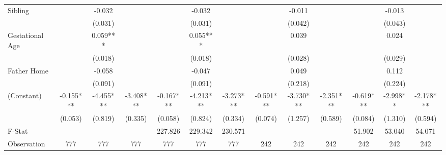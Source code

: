 \begin{tabular}{lcccccccccccc}
Sibling &  & -0.032 &  &  & -0.032 &  &  & -0.011 &  &  & -0.013 &  \\
 &  & (0.031) &  &  & (0.031) &  &  & (0.042) &  &  & (0.043) &  \\
Gestational Age &  & 0.059*** &  &  & 0.055*** &  &  & 0.039 &  &  & 0.024 &  \\
 &  & (0.018) &  &  & (0.018) &  &  & (0.028) &  &  & (0.029) &  \\
Father Home &  & -0.058 &  &  & -0.047 &  &  & 0.049 &  &  & 0.112 &  \\
 &  & (0.091) &  &  & (0.091) &  &  & (0.218) &  &  & (0.224) &  \\
(Constant) & -0.155*** & -4.455*** & -3.408*** & -0.167*** & -4.213*** & -3.273*** & -0.591*** & -3.730*** & -2.351*** & -0.619*** & -2.998** & -2.178*** \\
 & (0.053) & (0.819) & (0.335) & (0.058) & (0.824) & (0.334) & (0.074) & (1.257) & (0.589) & (0.084) & (1.310) & (0.594) \\
\midrule 
F-Stat &  &  &  & 227.826 & 229.342 & 230.571 &  &  &  & 51.902 & 53.040 & 54.071 \\
Observation & 777 & 777 & 777 & 777 & 777 & 777 & 242 & 242 & 242 & 242 & 242 & 242 \\
\midrule 
\bottomrule 
\end{tabular}
